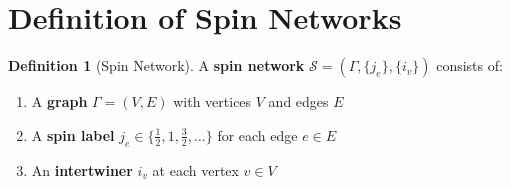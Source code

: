 \documentclass[11pt,a4paper,twoside]{book}
\theoremstyle{definition}
\newtheorem{definition}{Definition}[chapter]
\newcommand{\spinnetwork}{\mathcal{S}}
\begin{document}
\section{Definition of Spin Networks}

\begin{definition}[Spin Network]
A \textbf{spin network} $\spinnetwork = (\Gamma, \{j_e\}, \{i_v\})$ consists of:
\begin{enumerate}
    \item A \textbf{graph} $\Gamma = (V, E)$ with vertices $V$ and edges $E$
    \item A \textbf{spin label} $j_e \in \{\frac{1}{2}, 1, \frac{3}{2}, \ldots\}$ 
          for each edge $e \in E$
    \item An \textbf{intertwiner} $i_v$ at each vertex $v \in V$
\end{enumerate}
\end{definition}
\end{document}
